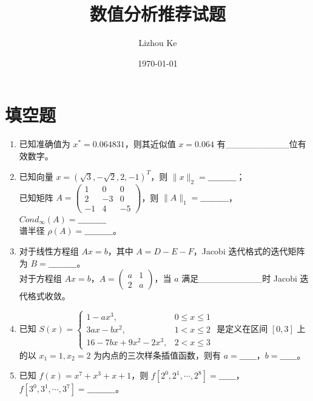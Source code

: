 \documentclass[12pt,a4paper]{article}
\title{数值分析推荐试题}
\author{Lizhou Ke}
\date{\today}
\begin{document}
    
    \maketitle
    
    \section{填空题}
    
    \begin{enumerate}
        
        \item 已知准确值为 $x^{*} = 0.064831$，则其近似值 $x = 0.064$ 有\_\_\_\_\_\_\_\_\_\_位有效数字。
        
        \item 已知向量 $x = (\sqrt{3}, -\sqrt{2}, 2, -1)^T$，则 $\|x\|_2 = \_\_\_\_\_\_\_\_\_\_$；\\
        已知矩阵 $A = \begin{pmatrix} 1 & 0 & 0 \\ 2 & -3 & 0 \\ -1 & 4 & -5 \end{pmatrix}$，则 $\|A\|_1 = \_\_\_\_\_\_\_\_\_\_$，\\
        $Cond_{\infty}(A)= \_\_\_\_\_\_\_\_\_\_$\\
        谱半径 $\rho(A) = \_\_\_\_\_\_\_\_\_\_$。
        
        \item 对于线性方程组 $Ax = b$，其中 $A = D - E - F$，Jacobi 迭代格式的迭代矩阵为 $B = \_\_\_\_\_\_\_\_\_\_$。\\
        对于方程组 $Ax = b$，$A = \begin{pmatrix} a & 1 \\ 2 & a \end{pmatrix}$，当 $a$ 满足\_\_\_\_\_\_\_\_\_\_时 Jacobi 迭代格式收敛。
        
        \item 已知 $S(x) = \begin{cases}
            1-ax^3, & 0 \leq x \leq 1 \\
            3ax - bx^2, & 1 < x \leq 2 \\
            16 - 7bx + 9x^2 - 2x^3, & 2 < x \leq 3
        \end{cases}$ 是定义在区间 $[0,3]$ 上的以 $x_1 = 1, x_2 = 2$ 为内点的三次样条插值函数，则有 $a = \_\_\_\_\_\_$，$b = \_\_\_\_\_\_$。
        
        \item 已知 $f(x) = x^7 + x^3 + x + 1$，则 $f[2^0, 2^1, \cdots, 2^8] = \_\_\_\_\_\_$，\\
        $f[3^0, 3^1, \cdots, 3^7] = \_\_\_\_\_\_\_\_\_\_$。
        

\end{enumerate}
\end{document}
